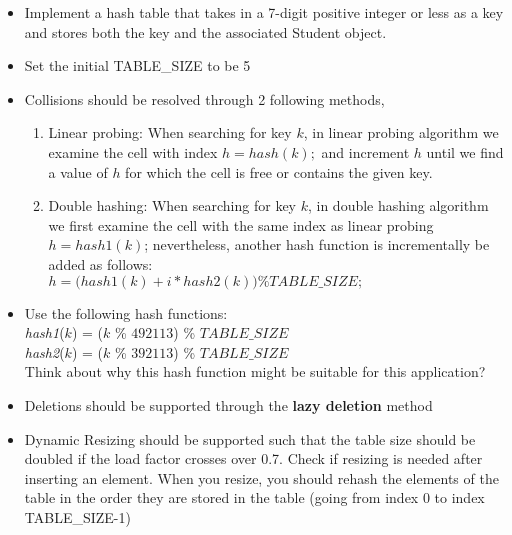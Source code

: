 \documentclass[times, 12pt]{article}
\begin{document}
\begin{itemize}
    \item Implement a hash table that takes in a 7-digit positive integer or less as a key and stores both the key and the associated Student object.
    
    \item Set the initial TABLE\_SIZE to be 5
    
    \item Collisions should be resolved through 2 following methods,
    \begin{enumerate}
        \item Linear probing: When searching for key $k$, in linear probing algorithm we examine the cell with index $h = hash(k);$ and increment $h$ until we find a value of $h$ for which the cell is free or contains the given key.
        \item Double hashing: When searching for key $k$, in double hashing algorithm we first examine the cell with the same index as linear probing $h = hash1(k)$; nevertheless, another hash function is incrementally be added as follows:\\
        $h = \Big(hash1(k) + i * hash2(k)\Big) \% TABLE\_SIZE;$
    \end{enumerate}

    \item Use the following hash functions:\\ \textit{hash1}($k$) = ($k$ \% $492113$) \% $TABLE\_SIZE$\\ \textit{hash2}($k$) = ($k$ \% $392113$) \% $TABLE\_SIZE$\\
    Think about why this hash function might be suitable for this application?

    \item Deletions should be supported through the \textbf{lazy deletion} method
    
    \item Dynamic Resizing should be supported such that the table size should be doubled if the load factor crosses over 0.7. Check if resizing is needed after inserting an element. When you resize, you should rehash the elements of the table in the order they are stored in the table (going from index 0 to index TABLE\_SIZE-1)
\end{itemize}
\end{document}

